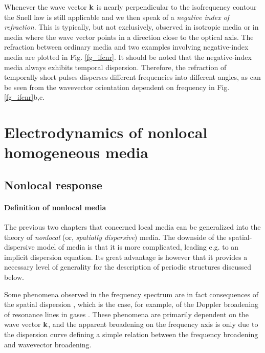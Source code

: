 Whenever the wave vector ${\mathbf{k}}$ is nearly perpendicular to the isofrequency contour the Snell law is still applicable and we then speak of a \textit{negative index of refraction}. 
This is typically, but not exclusively, observed in isotropic media or in media where the wave vector points in a direction close to the optical axis.
The refraction between ordinary media and two examples involving negative-index media are plotted in Fig. \ref{fg_ifcnr}. It should be noted that the negative-index media always exhibits temporal dispersion. Therefore, the refraction of temporally short pulses disperses different frequencies into different angles, as can be seen from the wavevector orientation dependent on frequency in Fig. \ref{fg_ifcnr}b,c.

\section{Electrodynamics of nonlocal homogeneous media} %
\label{chap_nonloc}
\subsection{Nonlocal response} 
\paragraph{Definition of nonlocal media}%
The previous two chapters that concerned local media can be generalized into the theory of \textit{nonlocal} (or, \textit{spatially dispersive}) media.  The downside of the spatial-dispersive model of media is that it is more complicated, leading e.g. to an implicit dispersion equation. Its great advantage is however that it provides a necessary level of generality for the description of periodic structures discussed below. 

Some phenomena observed in the frequency spectrum are in fact consequences of the spatial dispersion \cite[p. 359]{landau1984electrodynamics}, which is the case, for example, of the Doppler broadening of resonance lines in gases \cite{makarov2004permittivity}. These phenomena are primarily dependent on the wave vector ${\mathbf{k}}$, and the apparent broadening on the frequency axis is only due to the dispersion curve defining a simple relation between the frequency broadening and wavevector broadening.  

